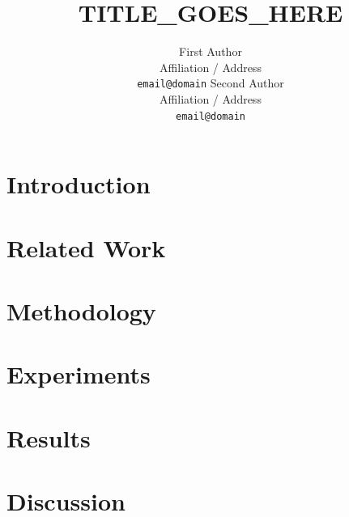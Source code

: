 \documentclass[11pt]{article}
\title{TITLE_GOES_HERE}
\author{First Author \\
  Affiliation / Address \\
  \texttt{email@domain}
\And
  Second Author \\
  Affiliation / Address \\
  \texttt{email@domain}
}
\begin{document}
\maketitle

\begin{abstract}
\end{abstract}

\section{Introduction}

\section{Related Work}

\section{Methodology}

\section{Experiments}

\section{Results}

\section{Discussion}
\end{document}
